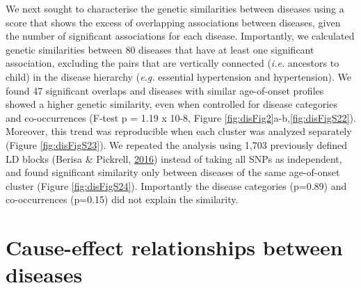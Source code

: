 \documentclass[12pt,twoside]{unicam}
\begin{document}
We next sought to characterise the genetic similarities between diseases using a score that shows the excess of overlapping associations between diseases, given the number of significant associations for each disease. Importantly, we calculated genetic similarities between 80 diseases that have at least one significant association, excluding the pairs that are vertically connected (\emph{i.e.} ancestors to child) in the disease hierarchy (\emph{e.g.} essential hypertension and hypertension). We found 47 significant overlaps and diseases with similar age-of-onset profiles showed a higher genetic similarity, even when controlled for disease categories and co-occurrences (F-test p = 1.19 x 10-8, Figure \ref{fig:disFig2}a-b,\ref{fig:disFigS22}). Moreover, this trend was reproducible when each cluster was analyzed separately (Figure \ref{fig:disFigS23}). We repeated the analysis using 1,703 previously defined LD blocks (Berisa \& Pickrell, \protect\hyperlink{ref-Berisa2016}{2016}) instead of taking all SNPs as independent, and found significant similarity only between diseases of the same age-of-onset cluster (Figure \ref{fig:disFigS24}). Importantly the disease categories (p=0.89) and co-occurrences (p=0.15) did not explain the similarity.

\hypertarget{cause-effect-relationships-between-diseases}{%
\section{Cause-effect relationships between diseases}\label{cause-effect-relationships-between-diseases}}
\end{document}
